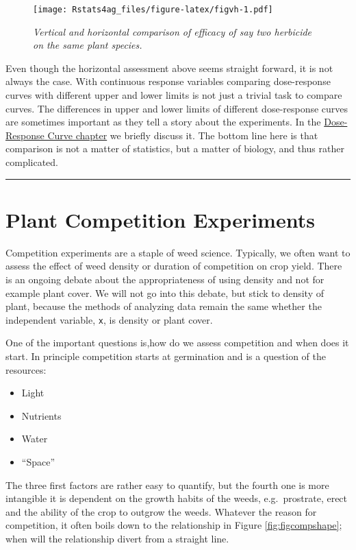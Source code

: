 \documentclass[letterpaper,]{book}
\providecommand{\tightlist}{%
  \setlength{\itemsep}{0pt}\setlength{\parskip}{0pt}}
\begin{document}
\begin{figure}
\centering
\texttt{[image: Rstats4ag\_files/figure-latex/figvh-1.pdf]}
\caption{\label{fig:figvh}\emph{Vertical and horizontal comparison of efficacy of say two herbicide on the same plant species.}}
\end{figure}

Even though the horizontal assessment above seems straight forward, it is not always the case. With continuous response variables comparing dose-response curves with different upper and lower limits is not just a trivial task to compare curves. The differences in upper and lower limits of different dose-response curves are sometimes important as they tell a story about the experiments. In the \protect\hyperlink{doseresponse1}{Dose-Response Curve chapter} we briefly discuss it. The bottom line here is that comparison is not a matter of statistics, but a matter of biology, and thus rather complicated.

\begin{center}\rule{0.5\linewidth}{0.5pt}\end{center}

\hypertarget{plant-competition-experiments}{%
\chapter{Plant Competition Experiments}\label{plant-competition-experiments}}

Competition experiments are a staple of weed science. Typically, we often want to assess the effect of weed density or duration of competition on crop yield. There is an ongoing debate about the appropriateness of using density and not for example plant cover. We will not go into this debate, but stick to density of plant, because the methods of analyzing data remain the same whether the independent variable, \texttt{x}, is density or plant cover.

One of the important questions is,how do we assess competition and when does it start. In principle competition starts at germination and is a question of the resources:

\begin{itemize}
\tightlist
\item
  Light
\item
  Nutrients
\item
  Water
\item
  ``Space''
\end{itemize}

The three first factors are rather easy to quantify, but the fourth one is more intangible it is dependent on the growth habits of the weeds, e.g.~prostrate, erect and the ability of the crop to outgrow the weeds. Whatever the reason for competition, it often boils down to the relationship in Figure \ref{fig:figcompshape}; when will the relationship divert from a straight line.
\end{document}
